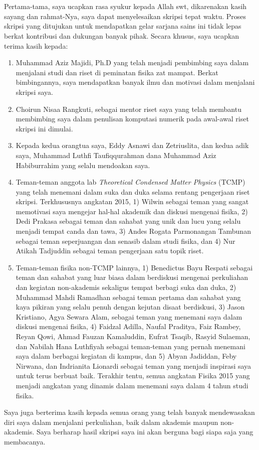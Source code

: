 \chapter*{\kataPengantar}
Pertama-tama, saya ucapkan rasa syukur kepada Allah swt, dikarenakan kasih sayang dan
rahmat-Nya, saya dapat menyelesaikan skripsi tepat waktu. Proses skripsi yang ditujukan
untuk mendapatkan gelar sarjana sains ini tidak lepas berkat kontribusi dan dukungan 
banyak pihak. Secara khusus, saya ucapkan terima kasih kepada:

\begin{enumerate}
	\item Muhammad Aziz Majidi, Ph.D yang telah menjadi pembimbing saya dalam menjalani
	studi dan riset di peminatan fisika zat mampat. Berkat bimbingannya, saya mendapatkan
	banyak ilmu dan motivasi dalam menjalani skripsi saya.
	\item Choirun Nisaa Rangkuti, sebagai mentor riset saya yang telah membantu membimbing saya
	dalam penulisan komputasi numerik pada awal-awal riset skripsi ini dimulai. 
	\item Kepada kedua orangtua saya, Eddy Asnawi dan Zetriuslita, dan kedua adik saya, Muhammad Luthfi 
	Taufiqqurahman dana Muhammad Aziz Habiburrahim yang selalu mendoakan saya.
	\item Teman-teman anggota lab \textit{Theoretical Condensed Matter Physics} (TCMP) yang telah
	menemani dalam suka dan duka selama rentang pengerjaan riset skripsi. Terkhususnya angkatan 2015, 
	1) Wilwin sebagai teman yang sangat memotivasi saya mengejar hal-hal akademik dan diskusi mengenai fisika,
	2) Dedi Prakasa sebagai teman dan sahabat yang unik dan lucu yang selalu menjadi tempat canda dan tawa, 3) Andes Rogata Parmonangan Tambunan sebagai teman seperjuangan dan senasib
	dalam studi fisika, dan 4) Nur Atikah Tadjuddin sebagai teman pengerjaan satu topik riset.
	\item Teman-teman fisika non-TCMP lainnya, 1) Benedictus Bayu Respati sebagai teman dan sahabat yang luar biasa
	dalam berdiskusi mengenai perkuliahan dan kegiatan non-akademis sekaligus tempat berbagi suka dan duka, 
	2) Muhammad Mahdi Ramadhan sebagai teman pertama dan sahabat yang kaya pikiran yang selalu penuh dengan
	kejutan disaat berdiskusi, 3) Jason Kristiano, Agya Sewara Alam, sebagai teman yang menemani saya dalam
	diskusi mengenai fisika, 4) Faidzal Adilla, Naufal Praditya, Faiz Rambey, Reyan Qowi, Ahmad Fauzan Kamaluddin, Eufrat Tsaqib,
	Rasyid Sulaeman, dan Nabilah Hana Luthfiyah sebagai teman-teman yang pernah menemani saya dalam berbagai kegiatan di kampus,
	dan 5) Abyan Jadiddan, Feby Nirwana, dan Indrianita Lionardi sebagai teman yang menjadi inspirasi saya untuk 
	terus berbuat baik. Terakhir tentu, semua angkatan Fisika 2015 yang menjadi angkatan yang dinamis dalam 
	menemani saya dalam 4 tahun studi fisika.
\end{enumerate}
Saya juga berterima kasih kepada semua orang yang telah banyak mendewasakan diri saya dalam menjalani perkuliahan, baik
dalam akademis maupun non-akademis. Saya berharap hasil skripsi saya ini akan berguna bagi siapa saja yang membacanya.


